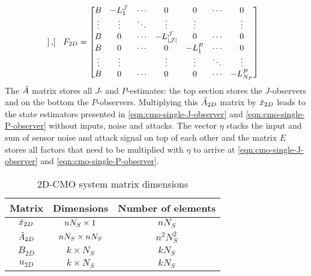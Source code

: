 \begin{equation}
\begin{split}
\begin{bmatrix}
        \end{bmatrix}, \quad 
        F_{2D} = 
        \begin{bmatrix}
            B & -L_1^{\mathcal{J}} & \cdots & 0 & 0 & \cdots & 0 \\
            \vdots & \vdots & \ddots & \vdots & \vdots & & \vdots \\
            B & 0 & \cdots & -L_{|\mathcal{J}|}^{\mathcal{J}} & 0 & \cdots & 0 \\
            B & 0 & \cdots & 0 & -L_{1}^{\mathcal{P}} & \cdots & 0 \\
            \vdots & \vdots & & \vdots & \vdots & \ddots & \vdots \\
            B & 0 & \cdots & 0 & 0 & \cdots & -L_{N_P}^{\mathcal{P}} \\
        \end{bmatrix}\\
    \end{split}
\end{equation}
The $\Tilde{A}$ matrix stores  all $J$- and $P$-estimates: the top section stores the $J$-observers and on the bottom the $P$-observers. Multiplying this $\Tilde{A}_{2D}$ matrix by $\Tilde{x}_{2D}$ leads to the state estimators presented in \eqref{eqn:cmo-single-J-observer} and \eqref{eqn:cmo-single-P-observer} without inputs, noise and attacks. The vector $\eta$ stacks the input and sum of sensor noise and attack signal on top of each other and the matrix $E$ stores all factors that need to be multiplied with $\eta$ to arrive at \eqref{eqn:cmo-single-J-observer} and \eqref{eqn:cmo-single-P-observer}.

\begin{table}[h]
    \centering
    \begin{tabular}{c|c|c}
       Matrix  & Dimensions & Number of elements \\ \hline
       $\Tilde{x}_{2D}$  & $nN_S \times 1$ & $nN_S$ \\
       $\Tilde{A}_{2D}$ & $nN_S \times nN_S$ & $n^2N_S^2$ \\
       $B_{2D}$ & $k \times N_S$ & $kN_S$ \\
       $u_{2D}$ & $k \times N_S$ & $kN_S$ \\
    \end{tabular}
    \caption{2D-CMO system matrix dimensions}
    \label{tab:2D-CMO-dimensions}
\end{table}



\newpage
